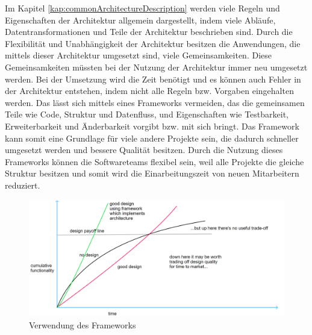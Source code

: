 Im Kapitel \ref{kap:commonArchitectureDescription} werden viele Regeln und Eigenschaften der Architektur allgemein dargestellt, 
indem viele Abläufe, Datentransformationen und Teile der Architektur beschrieben sind.
Durch die Flexibilität und Unabhängigkeit der Architektur besitzen die Anwendungen, die mittels dieser Architektur umgesetzt sind, viele Gemeinsamkeiten.
Diese Gemeinsamkeiten müssten bei der Nutzung der Architektur immer neu umgesetzt werden.
Bei der Umsetzung wird die Zeit benötigt und es können auch Fehler in der Architektur entstehen, indem nicht alle Regeln bzw. Vorgaben eingehalten werden.
Das lässt sich mittels eines Frameworks vermeiden, das die gemeinsamen Teile wie Code, Struktur und Datenfluss,  
und Eigenschaften wie Testbarkeit, Erweiterbarkeit und Änderbarkeit vorgibt bzw. mit sich bringt.
Das Framework kann somit eine Grundlage für viele andere Projekte sein, 
die dadurch schneller umgesetzt werden und bessere Qualität besitzen.
Durch die Nutzung dieses Frameworks können die Softwareteams flexibel sein,
weil alle Projekte die gleiche Struktur besitzen und somit wird die Einarbeitungszeit von neuen Mitarbeitern reduziert.

\begin{figure}[H]
    \centering
    \includegraphics[width=1\textwidth]{./images/QASoftwareCompareWithFramework2.png}
    \caption[Verwendung des Frameworks]{Verwendung des Frameworks}
    \label{fig:softQualityWithFramework2}
\end{figure} 
